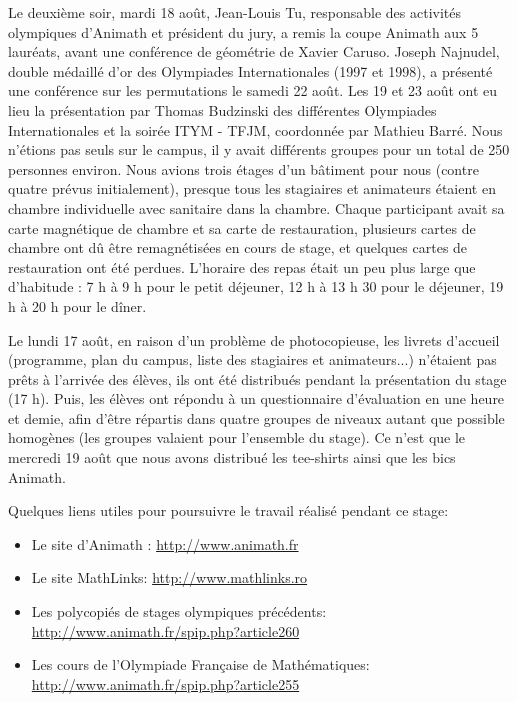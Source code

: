 Le deuxième soir, mardi 18 août, Jean-Louis Tu, responsable des activités olympiques d'Animath et président du jury, a remis la coupe Animath aux 5 lauréats, avant une conférence de géométrie de Xavier Caruso. Joseph Najnudel, double médaillé d'or des Olympiades Internationales (1997 et 1998), a présenté une conférence sur les permutations le samedi 22 août. Les 19 et 23 août ont eu lieu la présentation par Thomas Budzinski des différentes Olympiades Internationales et la soirée ITYM - TFJM, coordonnée par Mathieu Barré. Nous n'étions pas seuls sur le campus, il y avait différents groupes pour un total de 250 personnes environ. Nous avions trois étages d'un bâtiment pour nous (contre quatre prévus initialement), presque tous les stagiaires et animateurs étaient en chambre individuelle avec sanitaire dans la chambre. Chaque participant avait sa carte magnétique de chambre et sa carte de restauration, plusieurs cartes de chambre ont dû être remagnétisées en cours de stage, et quelques cartes de restauration ont été perdues. L'horaire des repas était un peu plus large que d'habitude : 7 h à 9 h pour le petit déjeuner, 12 h à 13 h 30 pour le déjeuner, 19 h à 20 h pour le dîner.  

Le lundi 17 août, en raison d'un problème de photocopieuse, les livrets d'accueil (programme, plan du campus, liste des stagiaires et animateurs...) n'étaient pas prêts à l'arrivée des élèves, ils ont été distribués pendant la présentation du stage (17 h). Puis, les élèves ont répondu à un questionnaire d'évaluation en une heure et demie, afin d'être répartis dans quatre groupes de niveaux autant que possible homogènes (les groupes valaient pour l'ensemble du stage). Ce n'est que le mercredi 19 août que nous avons distribué les tee-shirts ainsi que les bics Animath. 



\bigskip

Quelques liens utiles pour poursuivre le travail réalisé pendant ce
stage:
\begin{itemize}
\item Le site d'Animath : \href {http://www.animath.fr} {http://www.animath.fr}
\item Le site MathLinks: \href {http://www.mathlinks.ro} {http://www.mathlinks.ro}
\item Les polycopiés de stages olympiques précédents:  
\\
\href{http://www.animath.fr/spip.php?article260}{http://www.animath.fr/spip.php?article260}
\item Les cours de l'Olympiade Française de Mathématiques: 
\\
\href{http://www.animath.fr/spip.php?article255}{http://www.animath.fr/spip.php?article255}
\end{itemize}

